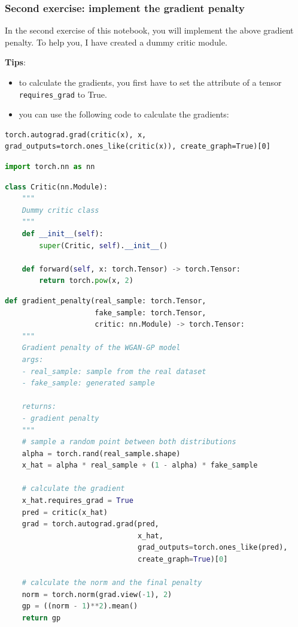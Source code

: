 \subsubsection{Second exercise: implement the gradient penalty}
In the second exercise of this notebook, you will implement the above
gradient penalty. To help you, I have created a dummy critic module. \newline

\textbf{Tips}: 
\begin{itemize}
    \item to calculate the gradients, you first have to set the attribute of a tensor \lstinline{requires_grad} to True.
    \item you can use the following code to calculate the gradients:
\end{itemize}

\begin{lstlisting}
torch.autograd.grad(critic(x), x, grad_outputs=torch.ones_like(critic(x)), create_graph=True)[0]
\end{lstlisting}

\begin{lstlisting}[language=Python]
import torch.nn as nn
\end{lstlisting}

\begin{lstlisting}[language=Python]
class Critic(nn.Module):
    """ 
    Dummy critic class 
    """
    def __init__(self):
        super(Critic, self).__init__()
        
    def forward(self, x: torch.Tensor) -> torch.Tensor:
        return torch.pow(x, 2)
\end{lstlisting}

\begin{lstlisting}[language=Python]
def gradient_penalty(real_sample: torch.Tensor, 
                     fake_sample: torch.Tensor,
                     critic: nn.Module) -> torch.Tensor:
    """
    Gradient penalty of the WGAN-GP model
    args:
    - real_sample: sample from the real dataset
    - fake_sample: generated sample
    
    returns:
    - gradient penalty
    """
    # sample a random point between both distributions
    alpha = torch.rand(real_sample.shape)
    x_hat = alpha * real_sample + (1 - alpha) * fake_sample
    
    # calculate the gradient
    x_hat.requires_grad = True
    pred = critic(x_hat)
    grad = torch.autograd.grad(pred, 
                               x_hat, 
                               grad_outputs=torch.ones_like(pred), 
                               create_graph=True)[0]
    
    # calculate the norm and the final penalty
    norm = torch.norm(grad.view(-1), 2)
    gp = ((norm - 1)**2).mean()    
    return gp
\end{lstlisting}

